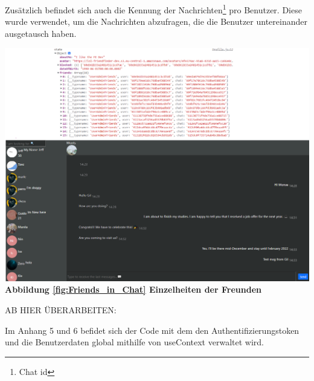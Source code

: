 Zusätzlich befindet sich auch die Kennung der Nachrichten\footnote{Chat id} pro Benutzer. Diese wurde verwendet, um die Nachrichten abzufragen, die die Benutzer untereinander ausgetausch haben.
\begin{center}
  \includegraphics[scale=0.55]
  {sources/Friends_in_Chat}\label{fig:Friends_in_Chat}\\
  \textbf{Abbildung \autoref{fig:Friends_in_Chat}
  Einzelheiten der Freunden}
\end{center}
AB HIER ÜBERARBEITEN:

Im Anhang 5 und 6 befidet sich der Code mit dem den Authentifizierungstoken und die Benutzerdaten global  mithilfe von useContext verwaltet wird.

